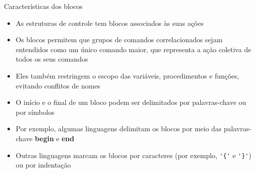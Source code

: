 \begin{frame}[fragile]{Características dos blocos}

    \begin{itemize}
        \item As estruturas de controle tem blocos associados às suas ações

        \item Os blocos permitem que grupos de comandos correlacionados sejam entendidos como
            um único comando maior, que representa a ação coletiva de todos os seus comandos

        \item Eles também restringem o escopo das variáveis, procedimentos e funções, evitando
            conflitos de nomes

        \item O início e o final de um bloco podem ser delimitados por palavras-chave ou por 
            símbolos

        \item Por exemplo, algumas linguagens delimitam os blocos por meio das palavras-chave 
            \textbf{begin} e \textbf{end}

        \item Outras linguagens marcam os blocos por caracteres (por exemplo, \verb|'{'| e 
            \verb|'}'|) ou por indentação
    \end{itemize}

\end{frame}
